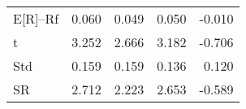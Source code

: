 \begin{tabular}{lrrrr}
\toprule
\midrule
E[R]--Rf & 0.060 & 0.049 & 0.050 & -0.010 \\
t & 3.252 & 2.666 & 3.182 & -0.706 \\
Std & 0.159 & 0.159 & 0.136 & 0.120 \\
SR & 2.712 & 2.223 & 2.653 & -0.589 \\
\bottomrule
\end{tabular}
